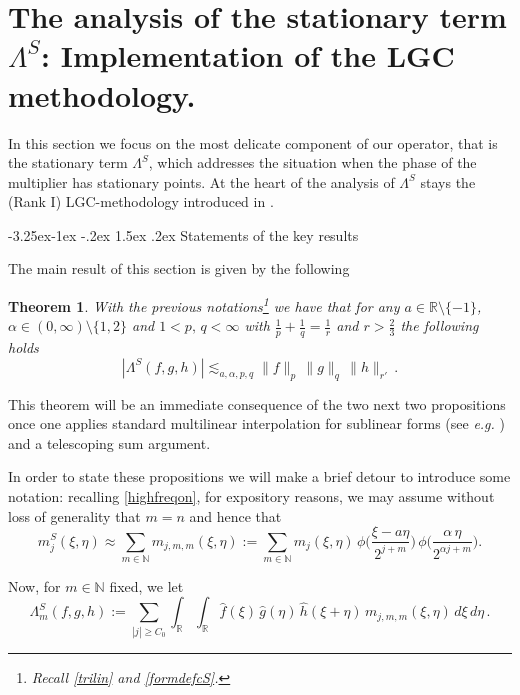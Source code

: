 \documentclass[a4paper,reqno]{amsart}
\makeatletter
\def\subsection{\@startsection{subsection}{2}{\z@}%
	{-3.25ex\@plus -1ex \@minus -.2ex}%
	{1.5ex \@plus .2ex}%
	{\normalfont\bfseries\boldmath}}
\numberwithin{equation}{section}
\newtheorem{theorem}{Theorem}[section]
\theoremstyle{definition}
\newcommand{\R}{\mathbb{R}}
\newcommand{\N}{\mathbb{N}}
\def\a{\alpha}
\def\L{\Lambda}
\makeatother
\begin{document}
\section{The analysis of the stationary term $\L^{S}$: Implementation of the LGC methodology.}\label{LGCimpl}

In this section we focus on the most delicate component of our operator, that is the stationary term $\L^{S}$, which addresses the situation when the phase of the multiplier has stationary points. At the heart of the analysis of $\L^{S}$ stays the (Rank I) LGC-methodology introduced in \cite{Lie19}.

\subsection{Statements of the key results}\label{MR1}

The main result of this section is given by the following

\begin{theorem}\label{thm:mS}
With the previous notations\footnote{Recall \eqref{trilin} and \eqref{formdefcS}.} we have that for any $a\in\R\setminus\{-1\}$,  $\a\in (0,\infty)\setminus\{1,2\}$ and $1<p,\,q<\infty$ with $\frac{1}{p}+\frac{1}{q}=\frac{1}{r}$ and $r>\frac{2}{3}$ the following holds
\begin{equation}\label{thm:mSS}
	|\L^S(f,g,h)|\lesssim_{a,\a,p,q} \|f\|_p\,\|g\|_q\,\|h\|_{r'}\,.
\end{equation}
\end{theorem}


This theorem will be an immediate consequence of the two next two propositions once one applies standard multilinear interpolation for sublinear forms (see \textit{e.g.} \cite{MS13}) and a telescoping sum argument.

In order to state these propositions we will make a brief detour to introduce some notation: recalling \eqref{highfreqon}, for expository reasons, we may assume without loss of generality that $m=n$ and hence that
\begin{equation}\label{mjS}
m_j^S(\xi,\eta)\approx\sum_{m\in\N}m_{j,m,m}(\xi,\eta):=
\sum_{m\in\N}m_j(\xi,\eta)\, \phi\Big(\frac{\xi-a\eta}{2^{j+m}}\Big)\,
\phi\Big(\frac{\a\,\eta}{2^{\a j+m}}\Big).
\end{equation}

Now, for $m\in\N$ fixed, we let
\begin{equation}\label{sjm}
	\L^S_{m}(f,g,h):=\sum_{|j|\ge C_0}\int_\R \int_\R \hat{f}(\xi)\,\hat{g}(\eta)\,\hat{h}(\xi+\eta)\,m_{j,m,m}(\xi,\eta)\,d\xi\,d\eta\,.
\end{equation}
\end{document}
